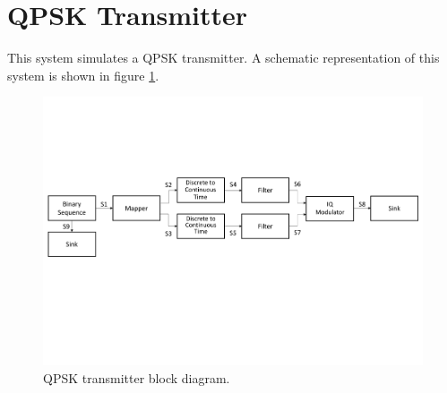 \section{QPSK Transmitter}

This system simulates a QPSK transmitter. A schematic representation of this system is shown in figure \ref{QPSK_transmitter_block_diagram_simple}.

\begin{figure}[h]
	\centering
	\includegraphics[width=1.0\textwidth]{./sdf/qpsk_transmitter/figures/qpsk_transmitter.pdf}
	\caption{QPSK transmitter block diagram.}\label{QPSK_transmitter_block_diagram_simple}
\end{figure}

